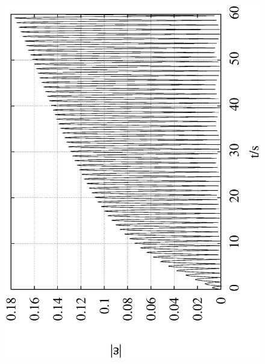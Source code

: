 \documentclass[10pt,a4paper]{article}
\begin{document}
\begin{figure}[h!]
\begin{center}
\includegraphics[scale = 0.3, angle =-90]{./Euler_0.07_10000_0.2.txt.eps}

\end{center}
\end{figure}
\end{document}
